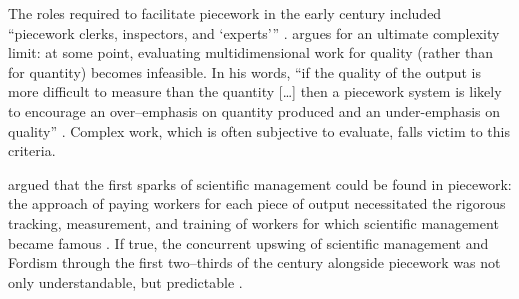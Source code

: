 \documentclass[trackingWork]{subfiles}
\begin{document}
The roles required to facilitate piecework in the early  century included ``piecework clerks, inspectors, and `experts'''
\cite{10.2307/23702539}.
\citeauthor{hart2016rise} argues for an ultimate complexity limit: at some point, evaluating multidimensional work for quality (rather than for quantity) becomes infeasible.
In his words,
``if the quality of the output is more difficult to measure than the quantity [\ldots]
then a piecework system is likely to encourage
an over--emphasis on quantity produced and an under-emphasis on quality''
\cite{hart2016rise}.
Complex work, which is often subjective to evaluate, falls victim to this criteria.

\citeauthor{10.2307/23702539} argued that the first sparks of scientific management
could be found in piecework:
the approach of paying workers for each piece of output necessitated
the rigorous tracking, measurement, and training of workers
for which scientific management became famous
\cite{10.2307/23702539}.
If true, 
the concurrent upswing of
scientific management and Fordism
through the first two--thirds of the  century
alongside piecework was not only understandable, but predictable
\cite{hart2013rise}.
\end{document}
